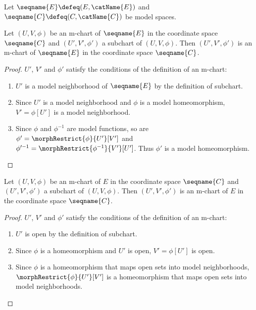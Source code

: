 \documentclass{article}
\begin{document}
\begin{lemma}[Subcharts]
\label{lem:M-subchart}
Let $\seqname{E} \defeq (E, \catName{E})$ and
$\seqname{C} \defeq (C,\catName{C})$ be model spaces.

Let $(U, V, \phi)$ be an m-chart of $\seqname{E}$ in the coordinate
space $\seqname{C}$ and $(U', V', \phi')$ a subchart of $(U, V, \phi)$.
Then $(U', V', \phi')$ is an m-chart of $\seqname{E}$ in the coordinate
space $\seqname{C}$.

\begin{proof}
$U'$, $V'$ and $\phi'$ satisfy the conditions of the definition of an m-chart:
\begin{enumerate}
\item $U'$ is a model neighborhood of $\seqname{E}$ by the definition of
subchart.
\item Since $U'$ is a model neighborhood and $\phi$ is a model
homeomorphism,
\nobreaks
  {{
    $V'=\phi[U']$
  }}
is a model neighborhood.
\item Since $\phi$ and $\phi^{-1}$ are model functions, so are
$\phi' = \morphRestrict{\phi}{U'}[V']$ and
$\phi'^{-1} = \morphRestrict{\phi^{-1}}{V'}[U']$. Thus $\phi'$ is a model
homeomorphism.
\end{enumerate}
\end{proof}

Let $(U, V, \phi)$ be an m-chart of $E$ in the coordinate space
$\seqname{C}$ and $(U', V', \phi')$ a subchart of $(U, V, \phi)$. Then
$(U', V', \phi')$ is an m-chart of $E$ in the coordinate space
$\seqname{C}$.

\begin{proof}
$U'$, $V'$ and $\phi'$ satisfy the conditions of the definition of an m-chart:
\begin{enumerate}
\item $U'$ is open by the definition of subchart.
\item Since $\phi$ is a homeomorphism and $U'$ is open, $V'=\phi[U']$ is open.
\item Since $\phi$ is a homeomorphism that maps open sets into model
neighborhoods, $\morphRestrict{\phi}{U'}[V']$ is a homeomorphism that maps
open sets into model neighborhoods.
\end{enumerate}
\end{proof}
\end{lemma}
\end{document}
